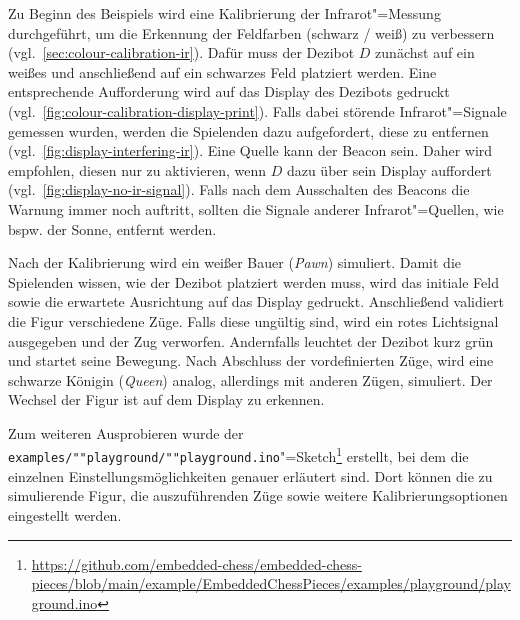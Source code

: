 Zu Beginn des Beispiels wird eine Kalibrierung der Infrarot"=Messung durchgeführt, um die Erkennung der Feldfarben (schwarz / weiß) zu verbessern (vgl.~\autoref{sec:colour-calibration-ir}). Dafür muss der Dezibot $D$ zunächst auf ein weißes und anschließend auf ein schwarzes Feld platziert werden. Eine entsprechende Aufforderung wird auf das Display des Dezibots gedruckt (vgl.~\autoref{fig:colour-calibration-display-print}). Falls dabei störende Infrarot"=Signale gemessen wurden, werden die Spielenden dazu aufgefordert, diese zu entfernen (vgl.~\autoref{fig:display-interfering-ir}). Eine Quelle kann der Beacon sein. Daher wird empfohlen, diesen nur zu aktivieren, wenn $D$ dazu über sein Display auffordert (vgl.~\autoref{fig:display-no-ir-signal}). Falls nach dem Ausschalten des Beacons die Warnung immer noch auftritt, sollten die Signale anderer Infrarot"=Quellen, wie bspw. der Sonne, entfernt werden.

Nach der Kalibrierung wird ein weißer Bauer (\emph{Pawn}) simuliert. Damit die Spielenden wissen, wie der Dezibot platziert werden muss, wird das initiale Feld sowie die erwartete Ausrichtung auf das Display gedruckt. Anschließend validiert die Figur verschiedene Züge. Falls diese ungültig sind, wird ein rotes Lichtsignal ausgegeben und der Zug verworfen. Andernfalls leuchtet der Dezibot kurz grün und startet seine Bewegung. Nach Abschluss der vordefinierten Züge, wird eine schwarze Königin (\emph{Queen}) analog, allerdings mit anderen Zügen, simuliert. Der Wechsel der Figur ist auf dem Display zu erkennen.

Zum weiteren Ausprobieren wurde der \texttt{examples/""playground/""playground.ino}"=Sketch\footnote{\url{https://github.com/embedded-chess/embedded-chess-pieces/blob/main/example/EmbeddedChessPieces/examples/playground/playground.ino}} erstellt, bei dem die einzelnen Einstellungsmöglichkeiten genauer erläutert sind. Dort können die zu simulierende Figur, die auszuführenden Züge sowie weitere Kalibrierungsoptionen eingestellt werden.
